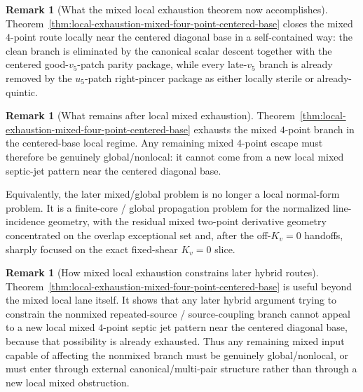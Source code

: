 \documentclass[11pt,a4paper]{amsart}
\theoremstyle{plain}
\theoremstyle{definition}
\newtheorem{remark}[theorem]{Remark}
\begin{document}
\begin{remark}[What the mixed local exhaustion theorem now accomplishes]
\label{rem:what-mixed-local-exhaustion-now-accomplishes}
Theorem~\ref{thm:local-exhaustion-mixed-four-point-centered-base} closes the
mixed $4$-point route locally near the centered diagonal base in a
self-contained way: the clean branch is eliminated by the canonical scalar
descent together with the centered good-$v_5$-patch parity package, while
every late-$v_5$ branch is already removed by the $u_5$-patch right-pincer
package as either locally sterile or already-quintic.
\end{remark}

\begin{remark}[What remains after local mixed exhaustion]
\label{rem:what-remains-after-local-mixed-exhaustion}
Theorem~\ref{thm:local-exhaustion-mixed-four-point-centered-base} exhausts the
mixed $4$-point branch in the centered-base local regime. Any remaining mixed
$4$-point escape must therefore be genuinely global/nonlocal: it cannot come
from a new local mixed septic-jet pattern near the centered diagonal base.

Equivalently, the later mixed/global problem is no longer a local normal-form
problem. It is a finite-core / global propagation problem for the normalized
line-incidence geometry, with the residual mixed two-point derivative geometry
concentrated on the overlap exceptional set and, after the off-$K_v=0$
handoffs, sharply focused on the exact fixed-shear $K_v=0$ slice.
\end{remark}

\begin{remark}[How mixed local exhaustion constrains later hybrid routes]
\label{rem:mixed-local-exhaustion-constrains-later-hybrids}
Theorem~\ref{thm:local-exhaustion-mixed-four-point-centered-base} is useful
beyond the mixed local lane itself. It shows that any later hybrid argument
trying to constrain the nonmixed repeated-source / source-coupling branch
cannot appeal to a new local mixed $4$-point septic jet pattern near the
centered diagonal base, because that possibility is already exhausted. Thus any
remaining mixed input capable of affecting the nonmixed branch must be genuinely
global/nonlocal, or must enter through external canonical/multi-pair structure
rather than through a new local mixed obstruction.
\end{remark}
\end{document}
